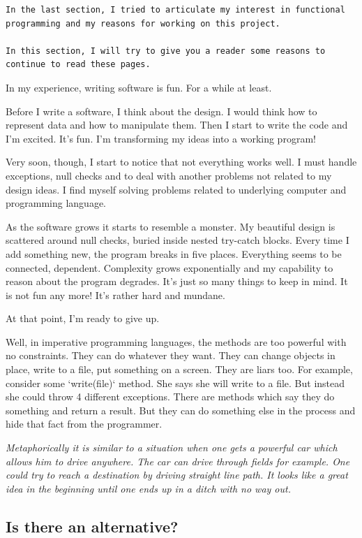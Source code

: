 \documentclass[12pt,twoside,a4paper]{report}
\begin{document}
\begin{lstlisting}
In the last section, I tried to articulate my interest in functional programming and my reasons for working on this project.

In this section, I will try to give you a reader some reasons to continue to read these pages.
\end{lstlisting}

In my experience, writing software is fun. For a while at least.

Before I write a software, I think about the design. I would think how to represent data and how to manipulate them. Then I start to write the code and I'm excited. It's fun. I'm transforming my ideas into a working program!

Very soon, though, I start to notice that not everything works well. I must handle exceptions, null checks and to deal with another problems not related to my design ideas. I find myself solving problems related to underlying computer and programming language.

As the software grows it starts to resemble a monster. My beautiful design is scattered around null checks, buried inside nested try-catch blocks. Every time I add something new, the program breaks in five places. Everything seems to be connected, dependent. Complexity grows exponentially and my capability to reason about the program degrades. It's just so many things to keep in mind. It is not fun any more! It's rather hard and mundane.

At that point, I'm ready to give up.

Well, in imperative programming languages, the methods are too powerful with no constraints. They can do whatever they want. They can change objects in place, write to a file, put something on a screen. They are liars too. For example, consider some `write(file)` method. She says she will write to a file. But instead she could throw 4 different exceptions. There are methods which say they do something and return a
result. But they can do something else in the process and hide that fact from the programmer.

\emph{Metaphorically it is similar to a situation when one gets a powerful car which allows him to drive anywhere. The car can drive through fields for example. One could try to reach a destination by driving straight line path. It looks like a great idea in the beginning until one ends up in a ditch with no way out.}

\subsection{Is there an alternative?}\label{6.2.1}
\end{document}
